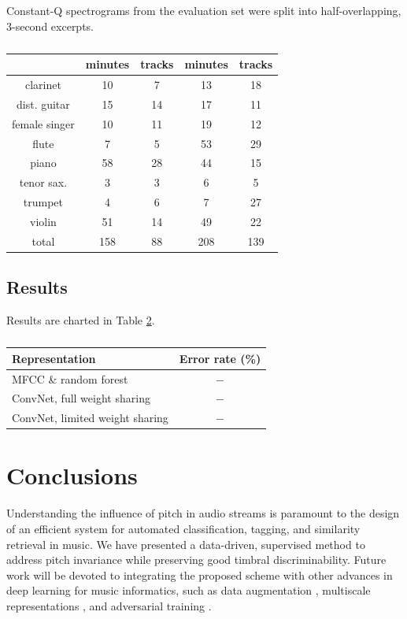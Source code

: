 \documentclass{article}
\begin{document}
Constant-Q spectrograms from the evaluation set were split into half-overlapping, 3-second excerpts.


\begin{table}
	\begin{center}
	\begin{tabular}{|c|cc|cc|}
		\hline
		& minutes & tracks & minutes & tracks \\
		\hline
		clarinet & 10 & 7 & 13 & 18 \\
		dist. guitar & 15 & 14 & 17 & 11 \\
		female singer & 10 & 11 & 19 & 12 \\
		flute & 7 & 5 & 53 & 29 \\
		piano & 58 & 28 & 44 & 15 \\
		tenor sax. & 3 & 3 & 6 & 5 \\
		trumpet & 4 & 6 & 7 & 27 \\
		violin & 51 & 14 & 49 & 22 \\
		\hline
		total & 158 & 88 & 208 & 139 \\
		\hline
	\end{tabular}
	\end{center}
	\caption{\label{table:single-label-durations}}
\end{table}

\subsection{Results}
Results are charted in Table \ref{table:single-label-results}.

\begin{table}
	\begin{center}
	\begin{tabular}{|l|c|}
		\hline
		Representation & Error rate (\%) \\
		\hline
		MFCC \& random forest & $-$ \\
		ConvNet, full weight sharing & $-$ \\
		ConvNet, limited weight sharing & $-$ \\
		\hline
	\end{tabular}
	\end{center}
	\caption{\label{table:single-label-results}}
\end{table}

\section{Conclusions}
Understanding the influence of pitch in audio streams is paramount to the design of an efficient system for automated classification, tagging, and similarity retrieval in music. 
We have presented a data-driven, supervised method to address pitch invariance while preserving good timbral discriminability.
Future work will be devoted to integrating the proposed scheme with other advances in deep learning for music informatics, such as data augmentation \cite{McFee2015-muda}, multiscale representations \cite{Hamel2012, Anden2015}, and adversarial training \cite{Kereliuk2015}.

\end{document}
